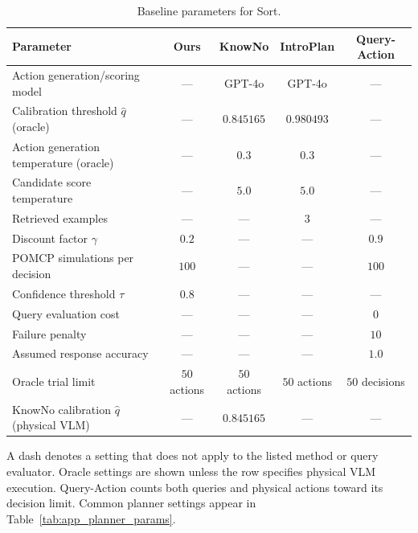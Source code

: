 \begin{table}[!htbp]
\centering
\caption{Baseline parameters for Sort.}
\label{tab:app_baseline_params_waste}
\small
\setlength{\tabcolsep}{5pt}
\renewcommand{\arraystretch}{1.12}
\begin{tabular*}{\textwidth}{@{\extracolsep{\fill}}lcccc@{}}
\toprule
Parameter & \textbf{Ours} & KnowNo & IntroPlan & Query-Action \\
\midrule
Action generation/scoring model & --- & GPT-4o & GPT-4o & --- \\
Calibration threshold $\hat{q}$ (oracle) & --- & $0.845165$ & $0.980493$ & --- \\
Action generation temperature (oracle) & --- & $0.3$ & $0.3$ & --- \\
Candidate score temperature & --- & $5.0$ & $5.0$ & --- \\
Retrieved examples & --- & --- & $3$ & --- \\
Discount factor $\gamma$ & $0.2$ & --- & --- & $0.9$ \\
POMCP simulations per decision & $100$ & --- & --- & $100$ \\
Confidence threshold $\tau$ & $0.8$ & --- & --- & --- \\
Query evaluation cost & --- & --- & --- & $0$ \\
Failure penalty & --- & --- & --- & $10$ \\
Assumed response accuracy & --- & --- & --- & $1.0$ \\
Oracle trial limit & $50$ actions & $50$ actions & $50$ actions & $50$ decisions \\
KnowNo calibration $\hat{q}$ (physical VLM) & --- & $0.845165$ & --- & --- \\
\bottomrule
\end{tabular*}
\par\smallskip
\begin{minipage}{\textwidth}
\footnotesize A dash denotes a setting that does not apply to the listed method or query evaluator. Oracle settings are shown unless the row specifies physical VLM execution. Query-Action counts both queries and physical actions toward its decision limit. Common planner settings appear in Table~\ref{tab:app_planner_params}.
\end{minipage}
\end{table}


